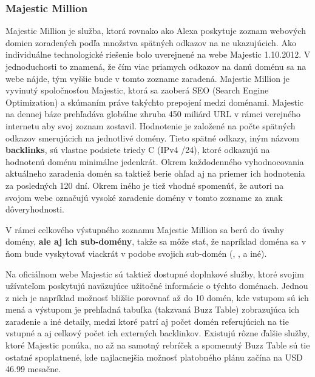 \subsubsection{Majestic Million}

Majestic Million je služba, ktorá rovnako ako Alexa poskytuje zoznam webových domien zoradených podľa množstva spätných odkazov na ne ukazujúcich. \cite{majestic-million-homepage}\cite{majestic-million-ranking}
Ako individuálne technologické riešenie bolo uverejnené na webe Majestic 1.10.2012. \cite{majestic-million-publication}
V jednoduchosti to znamená, že čím viac priamych odkazov na danú doménu sa na webe nájde, tým vyššie bude v tomto zozname zaradená. 
Majestic Million je vyvinutý spoločnosťou Majestic, ktorá sa zaoberá SEO (Search Engine Optimization) a skúmaním práve takýchto prepojení medzi doménami.
Majestic na dennej báze prehľadáva globálne zhruba 450 miliárd URL v rámci verejného internetu aby svoj zoznam zostavil. 
Hodnotenie je založené na počte spätných odkazov smerujúcich na jednotlivé domény. Tieto spätné odkazy, iným názvom \textbf{backlinks}, sú vlastne podsiete triedy C (IPv4 /24), ktoré odkazujú
na hodnotenú doménu minimálne jedenkrát.
Okrem každodenného vyhodnocovania aktuálneho zaradenia domén sa taktiež berie ohľad aj na priemer ich hodnotenia za posledných 120 dní. \cite{tranco-methodology}
Okrem iného je tiež vhodné spomenúť, že autori na svojom webe označujú vysoké zaradenie domény v tomto zozname za znak dôveryhodnosti. \cite{majestic-million-homepage}

V rámci celkového výstupného zoznamu Majestic Million sa berú do úvahy domény, \textbf{ale aj ich sub-domény}, takže sa môže stať, že napríklad doména  sa v ňom bude vyskytovať viackrát v podobe 
svojich sub-domén (, ,  a iné). \cite{majestic-million-sub-domain-filtered}

Na oficiálnom webe Majestic sú taktiež dostupné doplnkové služby, ktoré svojim užívateľom poskytujú naväzujúce užitočné informácie o týchto doménach. 
Jednou z nich je napríklad možnosť bližšie porovnať až do 10 domén, kde vstupom sú ich mená a výstupom je prehľadná tabuľka (takzvaná Buzz Table) zobrazujúca ich zaradenie a iné detaily, medzi ktoré patrí aj počet domén
referujúcich na tie vstupné a aj celkový počet ich externých backlinkov. \cite{majestic-million-homepage}
Existujú rôzne ďalšie služby, ktoré Majestic ponúka, no až na samotný rebríček a spomenutý Buzz Table sú tie ostatné spoplatnené, kde najlacnejšia možnosť platobného plánu začína na USD 46.99 mesačne. \cite{majestic-million-pricing}

